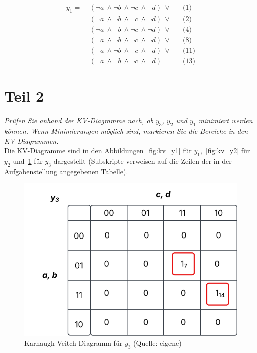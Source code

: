 \begin{equation}\label{eq:dnf_y1}
\begin{alignat}{3}
    y_1 =\ &(\neg a \ \land \neg b \ \land \neg c \ \land \phantom{\neg} d)\ \lor && \text{(1)}  \\
    &(\neg a \ \land \neg b \ \land  \phantom{\neg} c \ \land \neg d)\ \lor && \text{(2)}  \\
    &(\neg a \ \land  \phantom{\neg} b \ \land \neg  c \ \land \neg d)\ \lor && \text{(4)}  \\
    &(\phantom{\neg} a \ \land  \neg b \ \land \neg  c \ \land \neg d)\ \lor && \text{(8)}  \\
    &(\phantom{\neg} a \ \land  \neg b \ \land \phantom{\neg} c \ \land  \phantom{\neg} d)\ \lor && \text{(11)}  \\
    &(\phantom{\neg} a \ \land   \phantom{\neg} b \ \land \neg c \ \land  \phantom{\neg} d) && \text{(13)}
\end{alignat}
\end{equation}

\section{Teil 2}

\textit{Prüfen Sie anhand der KV-Diagramme nach, ob $y_3$, $y_2$ und $y_1$ minimiert
werden können. Wenn Minimierungen möglich sind, markieren Sie die Bereiche in den KV-Diagrammen.}\\

\noindent
Die KV-Diagramme sind in den Abbildungen~\ref{fig:kv_y1} für $y_1$,~\ref{fig:kv_y2} für $y_2$ und~\ref{fig:kv_y3} für $y_3$ dargestellt (Subskripte verweisen auf die Zeilen der in der Aufgabenstellung angegebenen Tabelle).\\

\begin{figure}
    \centering
    \includegraphics[scale=0.5]{aufgabe 2/img/kv_y3}
    \caption{Karnaugh-Veitch-Diagramm für $y_3$ (Quelle: eigene)}
    \label{fig:kv_y3}
\end{figure}

